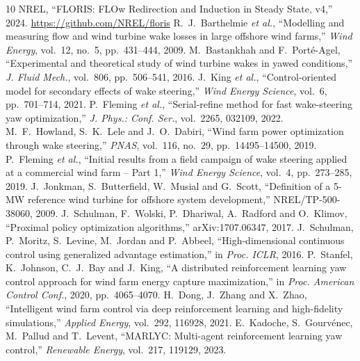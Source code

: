 \documentclass[conference,10pt]{IEEEtran}
\begin{document}
\clearpage  %
\begin{thebibliography}{10}
\footnotesize
{} NREL, ``FLORIS: FLOw Redirection and Induction in Steady State, v4,'' 2024. \url{https://github.com/NREL/floris}
 R.~J.~Barthelmie \emph{et al.}, ``Modelling and measuring flow and wind turbine wake losses in large offshore wind farms,'' \emph{Wind Energy}, vol.~12, no.~5, pp.~431--444, 2009.
 M.~Bastankhah and F.~Port\'e-Agel, ``Experimental and theoretical study of wind turbine wakes in yawed conditions,'' \emph{J. Fluid Mech.}, vol.~806, pp.~506--541, 2016.
 J.~King \emph{et al.}, ``Control-oriented model for secondary effects of wake steering,'' \emph{Wind Energy Science}, vol.~6, pp.~701--714, 2021.
 P.~Fleming \emph{et al.}, ``Serial-refine method for fast wake-steering yaw optimization,'' \emph{J. Phys.: Conf. Ser.}, vol.~2265, 032109, 2022.
 M.~F.~Howland, S.~K.~Lele and J.~O.~Dabiri, ``Wind farm power optimization through wake steering,'' \emph{PNAS}, vol.~116, no.~29, pp.~14495--14500, 2019.
 P.~Fleming \emph{et al.}, ``Initial results from a field campaign of wake steering applied at a commercial wind farm -- Part 1,'' \emph{Wind Energy Science}, vol.~4, pp.~273--285, 2019.
 J.~Jonkman, S.~Butterfield, W.~Musial and G.~Scott, ``Definition of a 5-MW reference wind turbine for offshore system development,'' NREL/TP-500-38060, 2009.
 J.~Schulman, F.~Wolski, P.~Dhariwal, A.~Radford and O.~Klimov, ``Proximal policy optimization algorithms,'' arXiv:1707.06347, 2017.
 J.~Schulman, P.~Moritz, S.~Levine, M.~Jordan and P.~Abbeel, ``High-dimensional continuous control using generalized advantage estimation,'' in \emph{Proc. ICLR}, 2016.
 P.~Stanfel, K.~Johnson, C.~J.~Bay and J.~King, ``A distributed reinforcement learning yaw control approach for wind farm energy capture maximization,'' in \emph{Proc. American Control Conf.}, 2020, pp.~4065--4070.
 H.~Dong, J.~Zhang and X.~Zhao, ``Intelligent wind farm control via deep reinforcement learning and high-fidelity simulations,'' \emph{Applied Energy}, vol.~292, 116928, 2021.
 E.~Kadoche, S.~Gourv\'enec, M.~Pallud and T.~Levent, ``MARLYC: Multi-agent reinforcement learning yaw control,'' \emph{Renewable Energy}, vol.~217, 119129, 2023.
\end{thebibliography}
\end{document}
